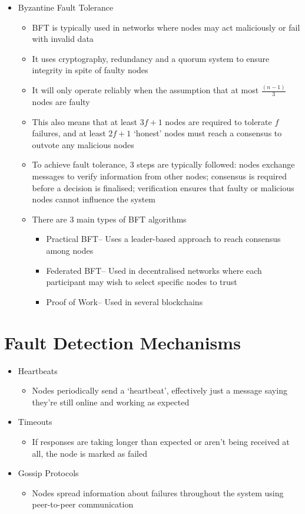 \begin{itemize}
\begin{itemize}
  \end{itemize}
  \item Byzantine Fault Tolerance
  \begin{itemize}
    \item BFT is typically used in networks where nodes may act maliciously or fail with invalid data
    \item It uses cryptography, redundancy and a quorum system to ensure integrity in spite of faulty nodes
    \item It will only operate reliably when the assumption that at most $\frac{(n - 1)}{3}$ nodes are faulty
    \item This also means that at least $3f + 1$ nodes are required to tolerate $f$ failures, and at least $2f + 1$ `honest' nodes must reach a consensus to outvote any malicious nodes
    \item To achieve fault tolerance, 3 steps are typically followed: nodes exchange messages to verify information from other nodes; consensus is required before a decision is finalised; verification ensures that faulty or malicious nodes cannot influence the system
    \item There are 3 main types of BFT algorithms
    \begin{itemize}
      \item Practical BFT-- Uses a leader-based approach to reach consensus among nodes
      \item Federated BFT-- Used in decentralised networks where each participant may wish to select specific nodes to trust
      \item Proof of Work-- Used in several blockchains
    \end{itemize}
  \end{itemize}
\end{itemize}

\section*{Fault Detection Mechanisms}

\begin{itemize}
  \item Heartbeats
  \begin{itemize}
    \item Nodes periodically send a `heartbeat', effectively just a message saying they're still online and working as expected
  \end{itemize}
  \item Timeouts
  \begin{itemize}
    \item If responses are taking longer than expected or aren't being received at all, the node is marked as failed
  \end{itemize}
  \item Gossip Protocols
  \begin{itemize}
    \item Nodes spread information about failures throughout the system using peer-to-peer communication
  \end{itemize}
\end{itemize}